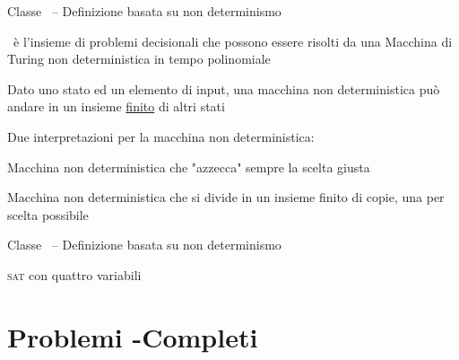 \begin{frame}{Classe \NP\ -- Definizione basata su non determinismo}

\vspace{-9pt}
\begin{myboxtitle}[Classe \NP]
\NP\ è l'insieme di problemi decisionali che possono essere risolti da
una Macchina di Turing non deterministica in tempo polinomiale
\end{myboxtitle}

\bigskip
{}
\BIL
\item Dato uno stato ed un elemento di input, una macchina non deterministica
può andare in un insieme \underline{finito} di altri stati
\item Due interpretazioni per la macchina non deterministica:
  \BI
  \item Macchina non deterministica che "azzecca" sempre la scelta giusta 
  \item Macchina non deterministica che si divide in un insieme finito di copie, una per scelta possibile
  \EI
\EIL

\end{frame}

\begin{frame}{Classe \NP\ -- Definizione basata su non determinismo}

\vspace{-9pt}
\begin{myboxtitle}[Esempio]
\textsc{sat} con quattro variabili

\end{myboxtitle}

\end{frame}

\section{Problemi \NP-Completi}

